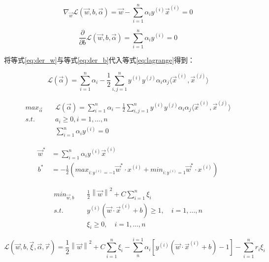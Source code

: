 \documentclass[letterpaper,11pt]{article}
\numberwithin{equation}{section}
\begin{document}
\begin{equation}
    \nabla_{\vec{w}}\mathcal{L}(\vec{w},b,\vec{\alpha})=\vec{w}-\sum_{i=1}^{n}\alpha_iy^{(i)}\vec{x}^{(i)}=0
    \label{eq:der_w}
\end{equation}

\begin{equation}
    \frac{\partial}{\partial b}\mathcal{L}(\vec{w},b,\vec{\alpha})=\sum_{i=1}^{n}\alpha_i y^{(i)}=0
    \label{eq:der_b}
\end{equation}

将等式\ref{eq:der_w}与等式\ref{eq:der_b}代入等式\ref{eq:lagrange}得到：

\begin{equation}
    \mathcal{L}(\vec{\alpha})=\sum_{i=1}^{n}\alpha_i - \frac{1}{2}\sum_{i,j=1}^{n}y^{(i)}y^{(j)}\alpha_i \alpha_j \langle \vec{x}^{(i)} , \vec{x}^{(j)} \rangle
\end{equation}

\begin{equation}
    \begin{aligned}
        max_{\vec{\alpha}} \quad & \mathcal{L}(\vec{\alpha})=\sum_{i=1}^{n}\alpha_i - \frac{1}{2}\sum_{i,j=1}^{n}y^{(i)}y^{(j)}\alpha_i \alpha_j \langle \vec{x}^{(i)} , \vec{x}^{(j)} \rangle \\
        s.t. \quad               & a_i \ge 0, i=1,\dots,n                                                                                                                                      \\
                                 & \sum_{i=1}^{n}\alpha_iy^{(i)}=0
    \end{aligned}
\end{equation}

\begin{equation}
    \begin{aligned}
        \vec{w}^{*} & =\sum_{i=1}^{n}\alpha_iy^{(i)}\vec{x}^{(i)}                                                               \\
        b^*         & =- \frac{1}{2} (max_{i:y^{(i)}=-1}\vec{w}^{*} \cdot x^{(i)} + min_{i:y^{(i)}=1}\vec{w}^{*} \cdot x^{(i)})
    \end{aligned}
\end{equation}

\begin{equation}
    \begin{aligned}
        min_{\vec{w},b} \quad & \frac{1}{2} {\left \| \vec{w} \right \|}^2 + C \sum_{i=1}^{n} \xi_i \\
        s.t. \quad            & y^{(i)}(\vec{w} \cdot \vec{x}^{(i)} + b) \ge 1, \quad i=1,\dots,n   \\
                              & \xi_i \ge 0, \quad i=1,\dots,n
    \end{aligned}
\end{equation}

\begin{equation}
    \mathcal{L}(\vec{w},b,\vec{\xi},\vec{\alpha},\vec{r})=\frac{1}{2} {\left \| \vec{w} \right \|}^2 + C \sum_{i=1}^{n} \xi_i -\sum_{n}^{i=1}\alpha_i \left[ y^{(i)}(\vec{w} \cdot \vec{x}^{(i)} + b)-1 \right] - \sum_{i=1}^{n} r_i \xi_i
    \label{eq:lagrange-soft-margin}
\end{equation}
\end{document}
